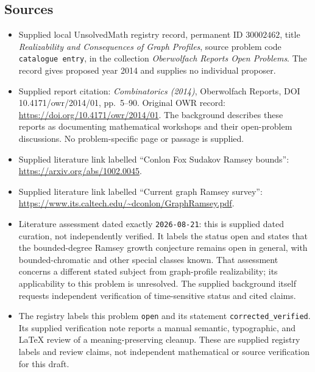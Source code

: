 \documentclass[11pt]{article}
\begin{document}
\subsection{Sources}
\begin{itemize}
\item Supplied local UnsolvedMath registry record, permanent ID \(30002462\), title \emph{Realizability and Consequences of Graph Profiles}, source problem code \texttt{catalogue entry}, in the collection \emph{Oberwolfach Reports Open Problems}. The record gives proposed year 2014 and supplies no individual proposer.
\item Supplied report citation: \emph{Combinatorics (2014)}, Oberwolfach Reports, DOI 10.4171/owr/2014/01, pp.\ 5--90. Original OWR record: \url{https://doi.org/10.4171/owr/2014/01}. The background describes these reports as documenting mathematical workshops and their open-problem discussions. No problem-specific page or passage is supplied.
\item Supplied literature link labelled ``Conlon Fox Sudakov Ramsey bounds'': \url{https://arxiv.org/abs/1002.0045}.
\item Supplied literature link labelled ``Current graph Ramsey survey'': \url{https://www.its.caltech.edu/~dconlon/GraphRamsey.pdf}.
\item Literature assessment dated exactly \texttt{2026-08-21}: this is supplied dated curation, not independently verified. It labels the status open and states that the bounded-degree Ramsey growth conjecture remains open in general, with bounded-chromatic and other special classes known. That assessment concerns a different stated subject from graph-profile realizability; its applicability to this problem is unresolved. The supplied background itself requests independent verification of time-sensitive status and cited claims.
\item The registry labels this problem \texttt{open} and its statement \texttt{corrected\_verified}. Its supplied verification note reports a manual semantic, typographic, and LaTeX review of a meaning-preserving cleanup. These are supplied registry labels and review claims, not independent mathematical or source verification for this draft.
\end{itemize}
\end{document}
